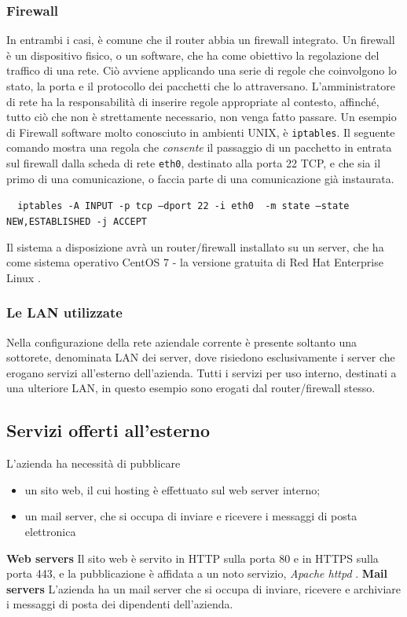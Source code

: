 \subsubsection{Firewall}
In entrambi i casi, è comune che il router abbia un firewall \cite{RFC2979} integrato.
Un firewall è un dispositivo fisico, o un software, che ha come obiettivo la regolazione del traffico di una rete.
Ciò avviene applicando una serie di regole che coinvolgono lo stato, la porta e il protocollo dei pacchetti che lo attraversano.
L'amministratore di rete ha la responsabilità di inserire regole appropriate al contesto, affinché, tutto ciò che non è strettamente necessario, non venga fatto passare.
Un esempio di Firewall software molto conosciuto in ambienti UNIX, è \texttt{iptables}.
Il seguente comando mostra una regola che \emph{consente} il passaggio di un pacchetto in entrata sul firewall dalla scheda di rete \texttt{eth0}, destinato alla porta 22 TCP, e che sia il primo di una comunicazione, o faccia parte di una comunicazione già instaurata.

\mbox{
    \texttt{
        iptables -A INPUT  -p tcp --dport 22 -i eth0 \
        -m state --state NEW,ESTABLISHED -j ACCEPT
    }
}



Il sistema a disposizione avrà un router/firewall installato su un server, che ha come sistema operativo CentOS 7 \cite{CENTOS} - la versione gratuita di Red Hat Enterprise Linux \cite{RHEL}.

\subsubsection{Le LAN utilizzate}
Nella configurazione della rete aziendale corrente è presente soltanto una sottorete, denominata LAN dei server, dove risiedono esclusivamente i server che erogano servizi all'esterno dell'azienda. Tutti i servizi per uso interno, destinati a una ulteriore LAN, in questo esempio sono erogati dal router/firewall stesso.

\subsection{Servizi offerti all'esterno}
L'azienda ha necessità di pubblicare
\begin{itemize}
    \item un sito web, il cui hosting è effettuato sul web server interno;
    \item un mail server, che si occupa di inviare e ricevere i messaggi di posta elettronica
\end{itemize}
\noindent \textbf{Web servers}
Il sito web è servito in HTTP sulla porta 80 e in HTTPS sulla porta 443, e la pubblicazione è affidata a un noto servizio, \emph{Apache httpd} \cite{APACHE}.
\noindent \textbf{Mail servers}
L'azienda ha un mail server che si occupa di inviare, ricevere e archiviare i messaggi di posta dei dipendenti dell'azienda.

